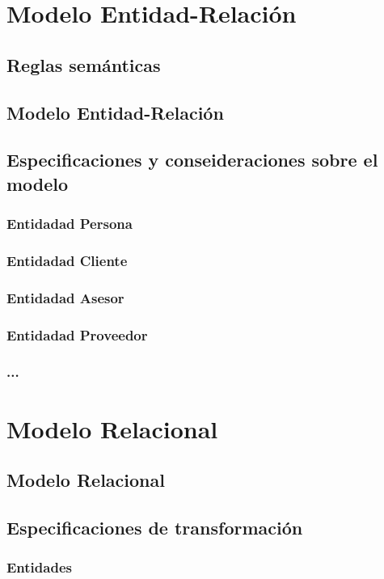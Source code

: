 \documentclass[12pt]{article}
\begin{document}
\section{Modelo Entidad-Relaci\'on}

\subsection{Reglas sem\'anticas}
\subsection{Modelo Entidad-Relaci\'on}
\subsection{Especificaciones y conseideraciones sobre el modelo}

\subsubsection{Entidadad Persona}
\subsubsection{Entidadad Cliente}
\subsubsection{Entidadad Asesor}
\subsubsection{Entidadad Proveedor}
\subsubsection{...}

\section{Modelo Relacional}

\subsection{Modelo Relacional}
\subsection{Especificaciones de transformaci\'on}

\subsubsection{Entidades}
\end{document}
